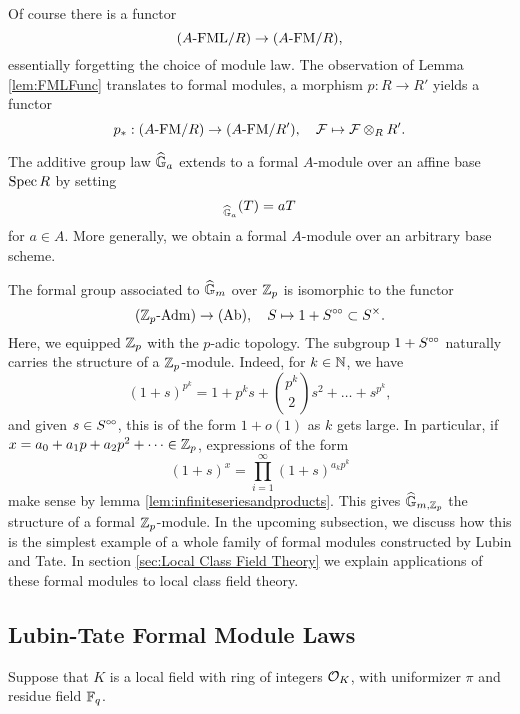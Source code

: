 \documentclass[../main.tex]{subfiles}
\begin{document}
Of course there is a functor 
\begin{equation*}
  {({A}\text-\mathrm{FML}/{R})} \to {({A}\text-\mathrm{FM}/{R})},
\end{equation*}
essentially forgetting the choice of module law. The observation of Lemma 
\ref{lem:FMLFunc} translates to formal modules, a morphism $p : R \to R'$ 
yields a functor 
\begin{equation*} p_*: {({A}\text-\mathrm{FM}/{R})} \to {({A}\text-\mathrm{FM}/{R'})}, \quad \mathcal{F} \mapsto \mathcal{F} \otimes_R R'.
\end{equation*}

\begin{xpl}
  The additive group law $\widehat{\mathbb{G}}_a$ extends to a formal $A$-module over an affine base
  $\operatorname{Spec} R$ by setting 
  \begin{equation*}
    [a]_{\GG_a}(T) = aT
  \end{equation*}
  for $a \in A$. More generally, we obtain a formal $A$-module over an arbitrary base
  scheme.

  The formal group associated to $\widehat{\mathbb{G}}_m$ over $\mathbb{Z}_p$ is isomorphic to the functor
  \begin{equation*}
    {({\mathbb{Z}_p}\text-\mathrm{Adm})} \to {(\mathrm{Ab})}, \quad S \mapsto 1 + S^{\circ \hspace{-0.5pt} \circ} \subset S^\times.
  \end{equation*}
  Here, we equipped $\mathbb{Z}_p$ with the $p$-adic topology.
  The subgroup $1 + S^{\circ \hspace{-0.5pt} \circ}$ naturally carries the structure of a $\mathbb{Z}_p$-module.
  Indeed, for $k \in \mathbb{N}$, we have
  \begin{equation*}
    (1+s)^{p^k} = 1 + p^ks + \binom{p^k}2 s^2 + \dots + s^{p^k},
  \end{equation*}
  and given $s \in S^{\circ \hspace{-0.5pt} \circ}$, this is of the form $1+ o(1)$ as $k$ gets large. 
  In particular, if $x = a_0 + a_1 p + a_2p^2 + \dots \in \mathbb{Z}_p$, expressions of the form
  \begin{equation*}
    (1+s)^x = \prod_{i = 1}^\infty (1+s)^{a_k p^k}
  \end{equation*}
  make sense by lemma \ref{lem:infiniteseriesandproducts}. This gives
  $\widehat{\mathbb{G}}_{m,\mathbb{Z}_p}$ the structure of a formal $\mathbb{Z}_p$-module. 
  In the upcoming subsection, we discuss how this is the simplest example of a
  whole family of formal modules constructed by 
  Lubin and Tate. In section \ref{sec:Local Class Field Theory} we explain applications of these formal modules to local class field theory.
\end{xpl}

\subsection{Lubin-Tate Formal Module Laws} %
\label{sub:Lubin-Tate Formal Module Laws}
Suppose that $K$ is a local field with ring of integers $\mathcal{O}_K$, with uniformizer
$\pi$ and residue field $\mathbb{F}_q$. 
\end{document}
